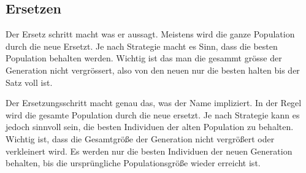 %
%
%
%
\subsection{Ersetzen
\label{varalgbuch:paper:varalg:subsection:replacement}}
Der Ersetz schritt macht was er aussagt. Meistens wird die ganze 
Population durch die neue Ersetzt. Je nach Strategie macht es Sinn, dass 
die besten Population behalten werden. Wichtig ist das man die gesammt 
grösse der Generation nicht vergrössert, also von den neuen nur die besten 
halten bis der Satz voll ist.

Der Ersetzungsschritt macht genau das, was der Name impliziert. In der 
Regel wird die gesamte Population durch die neue ersetzt. Je nach 
Strategie kann es jedoch sinnvoll sein, die besten Individuen der 
alten Population zu behalten. Wichtig ist, dass die Gesamtgröße der 
Generation nicht vergrößert oder verkleinert wird. Es werden  
nur die besten Individuen der neuen Generation behalten, bis die 
ursprüngliche Populationsgröße wieder erreicht ist.
